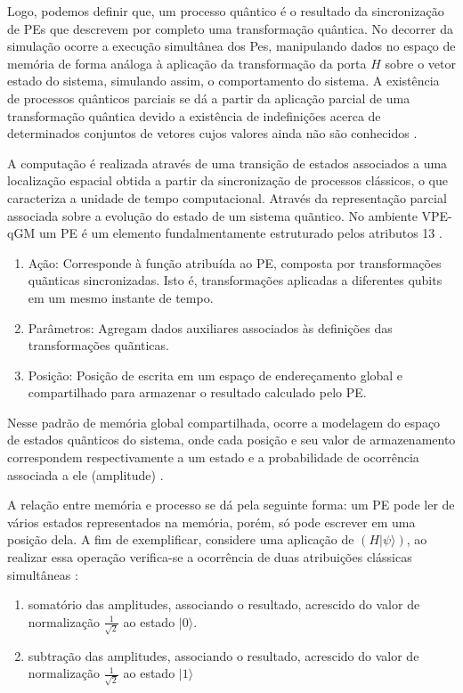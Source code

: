 \documentclass[tcc,capa]{texufpel}
\begin{document}
Logo, podemos definir que,  um processo quântico é o resultado da sincronização de PEs que descrevem por completo uma transformação quântica. No decorrer da simulação ocorre a execução simultânea dos Pes, manipulando dados no espaço de memória de forma análoga à aplicação da transformação da porta $H$ sobre o vetor estado do sistema, simulando assim, o comportamento do sistema. A existência de processos quânticos parciais se dá a partir da aplicação parcial de uma transformação quântica devido a existência de indefinições acerca de determinados conjuntos de vetores cujos valores ainda não são conhecidos \cite{maron:2013:ccgrid}. 

A computação é realizada através de uma transição de estados associados a uma localização espacial obtida a partir da sincronização de processos clássicos, o que caracteriza a unidade de tempo computacional. Através da representação parcial associada sobre a evolução do estado de um sistema quãntico. No ambiente VPE-qGM um PE é um elemento fundalmentamente estruturado pelos atributos \cite{MARON12b}13 \cite{Schmalfuss14}.

\begin{enumerate}
    \item Ação: Corresponde à função atribuída ao PE, composta por transformações quãnticas sincronizadas. Isto é, transformações aplicadas a diferentes qubits em um mesmo instante de tempo.
    \item Parâmetros: Agregam dados auxiliares associados às definições das transformações quãnticas.
    \item Posição: Posição de escrita em um espaço de endereçamento global e compartilhado para armazenar o resultado calculado pelo PE.
\end{enumerate}

Nesse padrão de memória global compartilhada, ocorre a modelagem do espaço de estados quãnticos do sistema, onde cada posição e seu valor de armazenamento correspondem respectivamente a um estado e a probabilidade de ocorrência associada a ele (amplitude) \cite{Schmalfuss14}.

A relação entre memória e processo se dá pela seguinte forma: um PE pode ler de vários estados representados na memória, porém, só pode escrever em uma posição dela. A fim de exemplificar, considere uma aplicação de $(H|\psi\rangle)$, ao realizar essa operação verifica-se a ocorrência de duas atribuições clássicas simultâneas \cite{maron:2013:ccgrid}:

\begin{enumerate}
    \item somatório das amplitudes, associando o resultado, acrescido do valor de normalização $\frac{1}{\sqrt{2}}$ ao estado $|0\rangle$.
    \item subtração das amplitudes, associando o resultado, acrescido do valor de normalização $\frac{1}{\sqrt{2}}$ ao estado $|1\rangle$
\end{enumerate}
\end{document}
